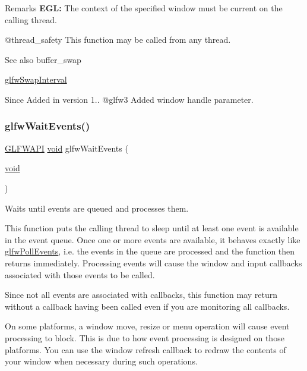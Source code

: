 \begin{DoxyRemark}{Remarks}
{\bfseries{E\+GL\+:}} The context of the specified window must be current on the calling thread.
\end{DoxyRemark}
@thread\+\_\+safety This function may be called from any thread.

\begin{DoxySeeAlso}{See also}
buffer\+\_\+swap 

\mbox{\hyperlink{group__context_ga12a595c06947cec4967c6e1f14210a8a}{glfw\+Swap\+Interval}}
\end{DoxySeeAlso}
\begin{DoxySince}{Since}
Added in version 1.. @glfw3 Added window handle parameter. 
\end{DoxySince}
\mbox{\label{group__window_ga6e042d05823c11e11c7339b81a237738}} 
\subsubsection{\texorpdfstring{glfwWaitEvents()}{glfwWaitEvents()}}
{\footnotesize\ttfamily \mbox{\hyperlink{glfw3_8h_a56da5036b2cc259351ae22fd6439bb47}{G\+L\+F\+W\+A\+PI}} \mbox{\hyperlink{glad_8h_a950fc91edb4504f62f1c577bf4727c29}{void}} glfw\+Wait\+Events (\begin{DoxyParamCaption}\item[{\mbox{\hyperlink{glad_8h_a950fc91edb4504f62f1c577bf4727c29}{void}}}]{ }\end{DoxyParamCaption})}



Waits until events are queued and processes them. 

This function puts the calling thread to sleep until at least one event is available in the event queue. Once one or more events are available, it behaves exactly like \mbox{\hyperlink{group__window_ga872d16e4c77f58c0436f356255920cfc}{glfw\+Poll\+Events}}, i.\+e. the events in the queue are processed and the function then returns immediately. Processing events will cause the window and input callbacks associated with those events to be called.

Since not all events are associated with callbacks, this function may return without a callback having been called even if you are monitoring all callbacks.

On some platforms, a window move, resize or menu operation will cause event processing to block. This is due to how event processing is designed on those platforms. You can use the window refresh callback to redraw the contents of your window when necessary during such operations.

